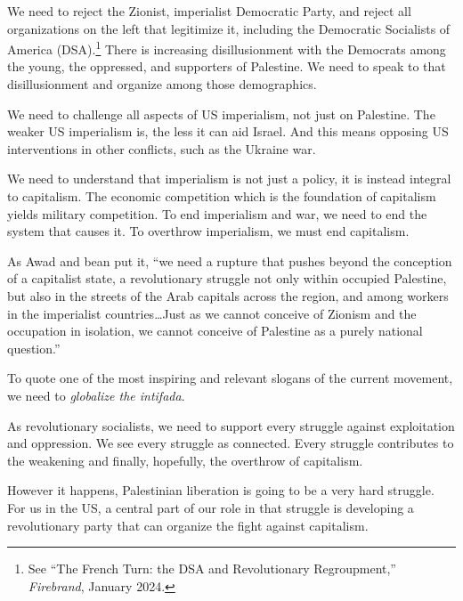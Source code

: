 We need to reject the Zionist, imperialist Democratic Party, and reject all organizations on the left that legitimize it, including the Democratic Socialists of America (DSA).\footnote{See ``The French Turn: the DSA and Revolutionary Regroupment,'' \emph{Firebrand}, January 2024.} There is increasing disillusionment with the Democrats among the young, the oppressed, and supporters of Palestine. We need to speak to that disillusionment and organize among those demographics.

We need to challenge all aspects of US imperialism, not just on Palestine. The weaker US imperialism is, the less it can aid Israel. And this means opposing US interventions in other conflicts, such as the Ukraine war.

We need to understand that imperialism is not just a policy, it is instead integral to capitalism. The economic competition which is the foundation of capitalism yields military competition. To end imperialism and war, we need to end the system that causes it. To overthrow imperialism, we must end capitalism.

As Awad and bean put it, ``we need a rupture that pushes beyond the conception of a capitalist state, a revolutionary struggle not only within occupied Palestine, but also in the streets of the Arab capitals across the region, and among workers in the imperialist countries\ldots Just as we cannot conceive of Zionism and the occupation in isolation, we cannot conceive of Palestine as a purely national question.''

To quote one of the most inspiring and relevant slogans of the current movement, we need to \emph{globalize the intifada}.

As revolutionary socialists, we need to support every struggle against exploitation and oppression. We see every struggle as connected. Every struggle contributes to the weakening and finally, hopefully, the overthrow of capitalism.

However it happens, Palestinian liberation is going to be a very hard struggle. For us in the US, a central part of our role in that struggle is developing a revolutionary party that can organize the fight against capitalism.
